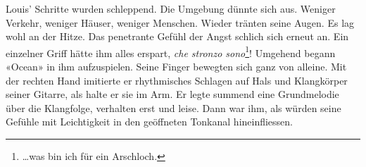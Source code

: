 Louis’ Schritte wurden schleppend. Die Umgebung dünnte sich aus.
Weniger Verkehr, weniger Häuser, weniger Menschen.
Wieder tränten seine Augen. Es lag wohl an der Hitze. Das penetrante
Gefühl der Angst schlich sich erneut an. Ein einzelner Griff hätte ihm
alles erspart, \emph{che stronzo sono}\footnote{…was bin ich für ein Arschloch.}! 
Umgehend begann «Ocean» in ihm aufzuspielen. Seine Finger bewegten sich ganz von alleine. Mit der rechten Hand
imitierte er rhythmisches Schlagen auf Hals und Klangkörper seiner Gitarre, als halte er sie im Arm. Er legte summend eine Grundmelodie über die Klangfolge, verhalten erst und leise. Dann war ihm, als würden seine Gefühle mit Leichtigkeit in den
geöffneten Tonkanal hineinfliessen. 


